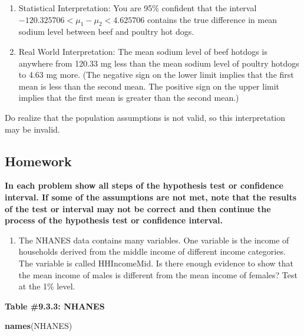 \documentclass[
]{book}
\newenvironment{Shaded}{\begin{snugshade}}{\end{snugshade}}
\newcommand{\KeywordTok}[1]{\textcolor[rgb]{0.13,0.29,0.53}{\textbf{#1}}}
\newcommand{\NormalTok}[1]{#1}
\providecommand{\tightlist}{%
  \setlength{\itemsep}{0pt}\setlength{\parskip}{0pt}}
\begin{document}
\begin{enumerate}
\def\labelenumi{\arabic{enumi}.}
\setcounter{enumi}{3}
\item
  Statistical Interpretation: You are 95\% confident that the interval \(-120.325706<\mu_1-\mu_2<4.625706\) contains the true difference in mean sodium level between beef and poultry hot dogs.
\item
  Real World Interpretation: The mean sodium level of beef hotdogs is anywhere from 120.33 mg less than the mean sodium level of poultry hotdogs to 4.63 mg more. (The negative sign on the lower limit implies that the first mean is less than the second mean. The positive sign on the upper limit implies that the first mean is greater than the second mean.)
\end{enumerate}

Do realize that the population assumptions is not valid, so this interpretation may be invalid.

\hypertarget{homework-2}{%
\subsection{Homework}\label{homework-2}}

\textbf{In each problem show all steps of the hypothesis test or confidence interval. If some of the assumptions are not met, note that the results of the test or interval may not be correct and then continue the process of the hypothesis test or confidence interval.}

\begin{enumerate}
\def\labelenumi{\arabic{enumi}.}
\tightlist
\item
  The NHANES data contains many variables. One variable is the income of households derived from the middle income of different income categories. The variable is called HHIncomeMid. Is there enough evidence to show that the mean income of males is different from the mean income of females? Test at the 1\% level.
\end{enumerate}

\textbf{Table \#9.3.3: NHANES}

\begin{Shaded}
\begin{Highlighting}[]
\KeywordTok{names}\NormalTok{(NHANES)}
\end{Highlighting}
\end{Shaded}
\end{document}
